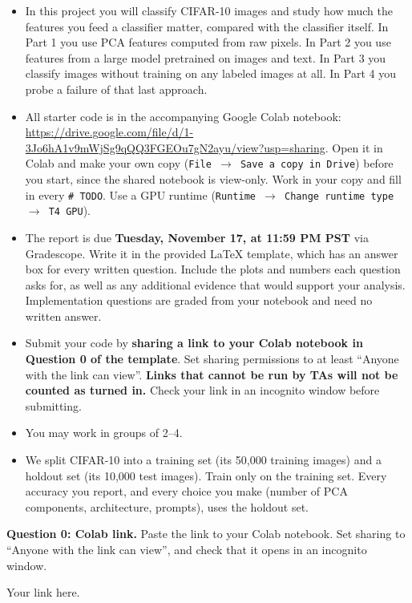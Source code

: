 \begin{itemize}
\item In this project you will classify CIFAR-10 images and study how much the
  features you feed a classifier matter, compared with the classifier itself.
  In Part 1 you use PCA features computed from raw pixels. In Part 2 you use features
  from a large model pretrained on images and text. In Part 3 you classify images
  without training on any labeled images at all. In Part 4 you probe a failure of that
  last approach.

\item All starter code is in the accompanying Google Colab notebook:
  \url{https://drive.google.com/file/d/1-3Jo6hA1v9mWjSg9qQQ3FGEOu7gN2ayu/view?usp=sharing}.
  Open it in Colab and make your own copy (\texttt{File $\rightarrow$ Save a copy in
  Drive}) before you start, since the shared notebook is view-only. Work in your copy and
  fill in every \texttt{\# TODO}. Use a GPU runtime
  (\texttt{Runtime $\rightarrow$ Change runtime type $\rightarrow$ T4 GPU}).

\item The report is due \textbf{Tuesday, November 17, at 11:59 PM PST} via Gradescope.
  Write it in the provided LaTeX template, which has an answer box for every written
  question. Include the plots and numbers each question asks for, as well as any additional
  evidence that would support your analysis. Implementation questions are
  graded from your notebook and need no written answer.

\item Submit your code by \textbf{sharing a link to your Colab notebook in Question 0
  of the template}. Set sharing permissions to at least ``Anyone with the link can view''.
  \textbf{Links that cannot be run by TAs will not be counted as turned in.} Check
  your link in an incognito window before submitting.

\item You may work in groups of 2--4.

\item We split CIFAR-10 into a training set (its 50,000 training images) and a holdout
  set (its 10,000 test images). Train only on the training set. Every accuracy you
  report, and every choice you make (number of PCA components, architecture, prompts),
  uses the holdout set.
\end{itemize}

\noindent\textbf{Question 0: Colab link.} Paste the link to your Colab notebook. Set sharing to
``Anyone with the link can view'', and check that it opens in an incognito window.
\begin{mdframed}
Your link here. %
\end{mdframed}


